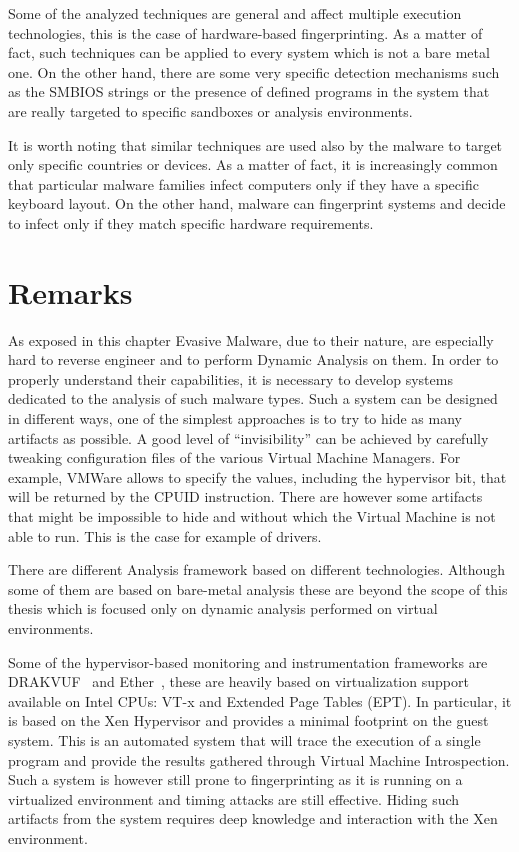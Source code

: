 Some of the analyzed techniques are general and affect multiple execution technologies, this is the case of hardware-based fingerprinting. As a matter of fact, such techniques can be applied to every system which is not a bare metal one. On the other hand, there are some very specific detection mechanisms such as the SMBIOS strings or the presence of defined programs in the system that are really targeted to specific sandboxes or analysis environments. 

It is worth noting that similar techniques are used also by the malware to target only specific countries or devices. As a matter of fact, it is increasingly common that particular malware families infect computers only if they have a specific keyboard layout. On the other hand, malware can fingerprint systems and decide to infect only if they match specific hardware requirements. 


\section{Remarks}

As exposed in this chapter Evasive Malware, due to their nature, are especially hard to reverse engineer and to perform Dynamic Analysis on them. In order to properly understand their capabilities, it is necessary to develop systems dedicated to the analysis of such malware types. Such a system can be designed in different ways, one of the simplest approaches is to try to hide as many artifacts as possible. A good level of ``invisibility'' can be achieved by carefully tweaking configuration files of the various Virtual Machine Managers. For example, VMWare allows to specify the values, including the hypervisor bit, that will be returned by the CPUID instruction. There are however some artifacts that might be impossible to hide and without which the Virtual Machine is not able to run. This is the case for example of drivers. 

There are different Analysis framework based on different technologies. Although some of them are based on bare-metal analysis these are beyond the scope of this thesis which is focused only on dynamic analysis performed on virtual environments.

Some of the hypervisor-based monitoring and instrumentation frameworks are DRAKVUF~\cite{lengyel2014drakvuf} and Ether~\cite{ether}, these are heavily based on virtualization support available on Intel CPUs: VT-x and Extended Page Tables (EPT). In particular, it is based on the Xen Hypervisor and provides a minimal footprint on the guest system. This is an automated system that will trace the execution of a single program and provide the results gathered through Virtual Machine Introspection. Such a system is however still prone to fingerprinting as it is running on a virtualized environment and timing attacks are still effective. Hiding such artifacts from the system requires deep knowledge and interaction with the Xen environment. 

